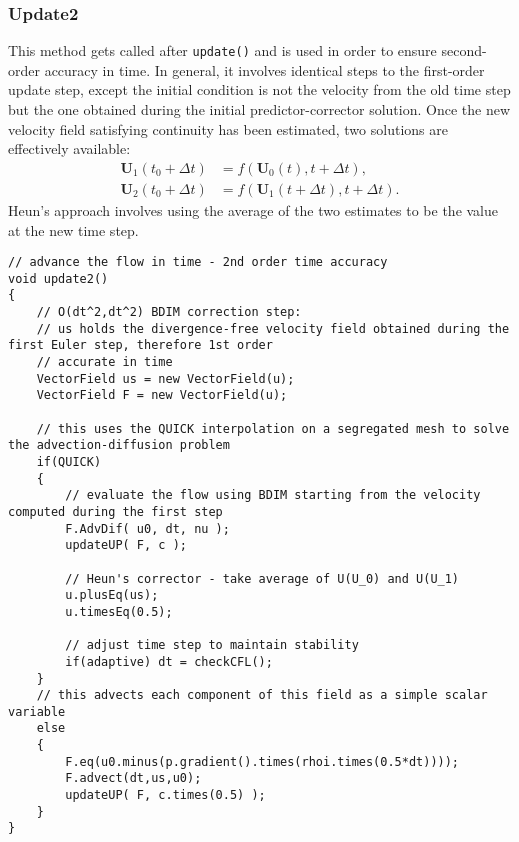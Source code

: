\documentclass[notitlepage]{article}
\begin{document}
\subsubsection{Update2}

This method gets called after \texttt{update()} and is used in order to ensure second-order
accuracy in time. 
In general, it involves identical steps to the first-order update step, except the initial
condition is not the velocity from the old time step but the one obtained during the
initial predictor-corrector solution.
Once the new velocity field satisfying continuity has been estimated, two solutions are effectively
available:
%
\begin{equation}\label{eq:HeunCorrector}
\begin{aligned}
\mathbf{U}_1(t_0 + \Delta t) &= f(\mathbf{U}_0(t),t+\Delta t) , \\
\mathbf{U}_2(t_0 + \Delta t) &= f(\mathbf{U}_1(t+\Delta t),t+\Delta t) .
\end{aligned}
\end{equation}
%
Heun's approach involves using the average of the two estimates to be the value at the new
time step.

\begin{lstlisting}[style=myCpp]
// advance the flow in time - 2nd order time accuracy
void update2()
{
	// O(dt^2,dt^2) BDIM correction step:
	// us holds the divergence-free velocity field obtained during the first Euler step, therefore 1st order
	// accurate in time
	VectorField us = new VectorField(u);
	VectorField F = new VectorField(u);
	
	// this uses the QUICK interpolation on a segregated mesh to solve the advection-diffusion problem
	if(QUICK)
	{
		// evaluate the flow using BDIM starting from the velocity computed during the first step
		F.AdvDif( u0, dt, nu );
		updateUP( F, c );
		
		// Heun's corrector - take average of U(U_0) and U(U_1)
		u.plusEq(us); 
		u.timesEq(0.5);
		
		// adjust time step to maintain stability
		if(adaptive) dt = checkCFL();
	}
	// this advects each component of this field as a simple scalar variable
	else
	{
		F.eq(u0.minus(p.gradient().times(rhoi.times(0.5*dt))));
		F.advect(dt,us,u0);
		updateUP( F, c.times(0.5) );
	}
}
\end{lstlisting}
\end{document}
